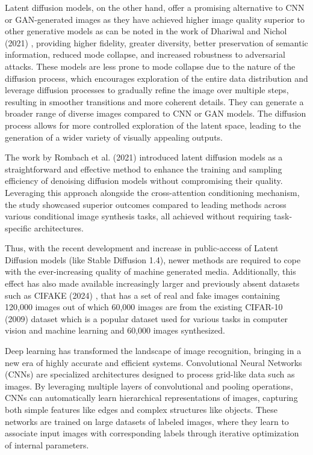 Latent diffusion models, on the other hand, offer a promising alternative to CNN or GAN-generated images as they have achieved higher image quality superior to other generative models as can be noted in the work of Dhariwal and Nichol (2021)  \cite{5}, providing higher fidelity, greater diversity, better preservation of semantic information, reduced mode collapse, and increased robustness to adversarial attacks. These models are less prone to mode collapse due to the nature of the diffusion process, which encourages exploration of the entire data distribution and leverage diffusion processes to gradually refine the image over multiple steps, resulting in smoother transitions and more coherent details. They can generate a broader range of diverse images compared to CNN or GAN models. The diffusion process allows for more controlled exploration of the latent space, leading to the generation of a wider variety of visually appealing outputs.

The work by Rombach et al. (2021)  \cite{2} introduced latent diffusion models as a straightforward and effective method to enhance the training and sampling efficiency of denoising diffusion models without compromising their quality. Leveraging this approach alongside the cross-attention conditioning mechanism, the study showcased superior outcomes compared to leading methods across various conditional image synthesis tasks, all achieved without requiring task-specific architectures. 

Thus, with the recent development and increase in public-access of Latent Diffusion  models (like Stable Diffusion 1.4), newer methods are required to cope with the ever-increasing quality of machine generated media. Additionally, this effect has also made available increasingly larger and previously absent datasets such as CIFAKE (2024)  \cite{6}, that has a set of real and fake images containing 120,000 images  out of which 60,000 images are from the existing CIFAR-10 (2009)  \cite{7} dataset which is a popular dataset used for various tasks in computer vision and machine learning and 60,000 images synthesized. 

Deep learning has transformed the landscape of image recognition, bringing in a new era of highly accurate and efficient systems. Convolutional Neural Networks (CNNs) are  specialized architectures designed to process grid-like data such as images. By leveraging multiple layers of convolutional and pooling operations, CNNs can automatically learn hierarchical representations of images, capturing both simple features like edges and complex structures like objects. These networks are trained on large datasets of labeled images, where they learn to associate input images with corresponding labels through iterative optimization of internal parameters. 

